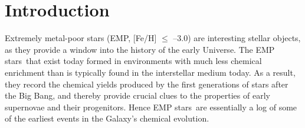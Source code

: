 \documentclass[]{aastex631}
\newcommand{\emps}{EMP stars\xspace}
\begin{document}


\section{Introduction} \label{sec:intro}

Extremely metal-poor stars (EMP, [Fe/H] $\leq$ –3.0) are interesting stellar objects, as they provide a window into the history of the early Universe. The \emps \ that exist today formed in environments with much less chemical enrichment than is typically found in the interstellar medium today. As a result, they record the chemical yields produced by the first generations of stars after the Big Bang, and thereby provide crucial clues to the properties of early supernovae and their progenitors.  Hence \emps \ are essentially a log of some of the earliest events in the Galaxy's chemical evolution.
\end{document}
